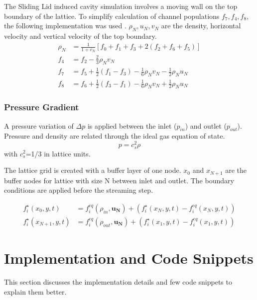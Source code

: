\documentclass[a4paper,11pt]{report}
\begin{document}
The Sliding Lid induced cavity simulation involves a moving wall on the top boundary of the lattice. To simplify calculation of channel populations $f_7, f_4, f_8$, the following implementation was used \cite{Mohamad2019}. $\rho_N, u_N, v_N$ are the density, horizontal velocity and vertical velocity of the top boundary.
\begin{equation}
\begin{aligned}
    \rho_N &= \frac1 {1+v_N} \left[f_0+f_1+f_3+2\left(f_2+f_6+f_5\right)\right] \\
    f_4 &= f_2 - \frac2 3 \rho_N v_N \\
    f_7 &= f_5 + \frac1 2 \left( f_1 - f_3 \right) - \frac1 6 \rho_N v_N - \frac1 2 \rho_N u_N \\
    f_8 &= f_6 + \frac1 2 \left( f_3 - f_1 \right) - \frac1 6 \rho_N v_N + \frac1 2 \rho_N u_N
\end{aligned}
\end{equation}

\subsection{Pressure Gradient}
A pressure variation of $\Delta p$ is applied between the inlet ($p_{in}$) and outlet ($p_{out}$). Pressure and density are related through the ideal gas equation of state. 
\begin{equation}
    p = c^2_s \rho
    \label{eq:pressure_density}
\end{equation}
with  $c^2_s$=1/3  in lattice units.

The lattice grid is created with a buffer layer of one node. $x_0$ and $x_{N+1}$ are the buffer nodes for lattice with size N between inlet and outlet. The boundary conditions are applied before the streaming step. \cite{Succi_10.1093/oso/9780199592357.001.0001}

\begin{equation}
    \begin{aligned}
        f^{\star}_i(x_0,y,t) &= f^{eq}_i(\rho_{in}, \mathbf{u_N}) + \left( f^{\star}_i(x_N,y,t) - f^{eq}_i(x_N,y,t)\right) \\
        f^{\star}_i(x_{N+1},y,t) &= f^{eq}_i(\rho_{out}, \mathbf{u_N}) + \left( f^{\star}_i(x_1,y,t) - f^{eq}_i(x_1,y,t)\right)
    \end{aligned}
\end{equation}

\chapter{Implementation and Code Snippets}
This section discusses the implementation details and few code snippets to explain them better. 
\end{document}
